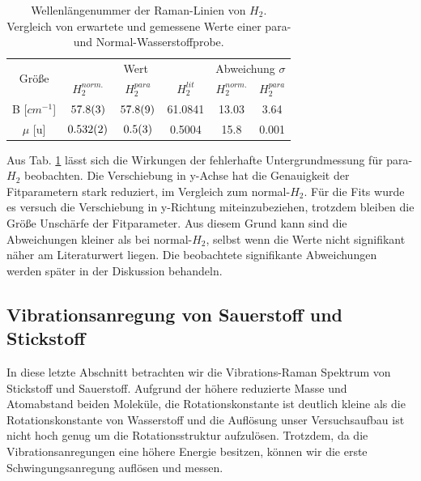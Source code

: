 \documentclass[11 pt]{article}
\begin{document}
\begin{table}[!htbp]
 \begin{center}
  \caption{\small Wellenlängenummer der Raman-Linien von $H_2$. Vergleich von erwartete und gemessene Werte einer para- und Normal-Wasserstoffprobe.}
  \label{tab:H2_B_mu}
  \renewcommand{\arraystretch}{1.3} %
  \begin{tabular}{|c|c|c|c|c|c|}
  \hline

\multirow{2}{*}{Größe}&\multicolumn{3}{c|}{Wert}& \multicolumn{2}{c|}{ Abweichung $\sigma$} \\ \cline{2-6} %
 					 &$H_2^{norm.}$	&	$H_2^{para}$ &  $H_2^{lit}$ &  $H_2^{norm.}$	&	$H_2^{para}$\\ 
  \hline
	\hline 
B [$\unit{cm^{-1}}$] & $\num{57.8\pm0.3}$ & $\num{57.8\pm0.9}$ & 61.0841 & 13.03 & 3.64 \\
$\mu$ [$\unit{\atomicmassunit}$] & $\num{0.532\pm0.002}$& $\num{0.5\pm0.3}$&0.5004 &15.8 & 0.001\\
	\hline
  \end{tabular}
  \renewcommand{\arraystretch}{1}
 \end{center}
\end{table}

Aus Tab. \ref{tab:H2_B_mu} lässt sich die Wirkungen der fehlerhafte Untergrundmessung für para-$H_2$ beobachten. Die Verschiebung in y-Achse hat die Genauigkeit der Fitparametern stark reduziert, im Vergleich zum normal-$H_2$. Für die Fits wurde es versuch die Verschiebung in y-Richtung miteinzubeziehen, trotzdem bleiben die Größe Unschärfe der Fitparameter. Aus diesem Grund kann sind die Abweichungen kleiner als bei normal-$H_2$, selbst wenn die Werte nicht signifikant näher am Literaturwert liegen. Die beobachtete signifikante Abweichungen werden später in der Diskussion behandeln. 

\subsection{Vibrationsanregung von Sauerstoff und Stickstoff}
In diese letzte Abschnitt betrachten wir die Vibrations-Raman Spektrum von Stickstoff und Sauerstoff. Aufgrund der höhere reduzierte Masse und Atomabstand beiden Moleküle, die Rotationskonstante ist deutlich kleine als die Rotationskonstante von Wasserstoff und die Auflösung unser Versuchsaufbau ist nicht hoch genug um die Rotationsstruktur aufzulösen. Trotzdem, da die Vibrationsanregungen eine höhere Energie besitzen, können wir die erste Schwingungsanregung auflösen und messen. 
\end{document}
